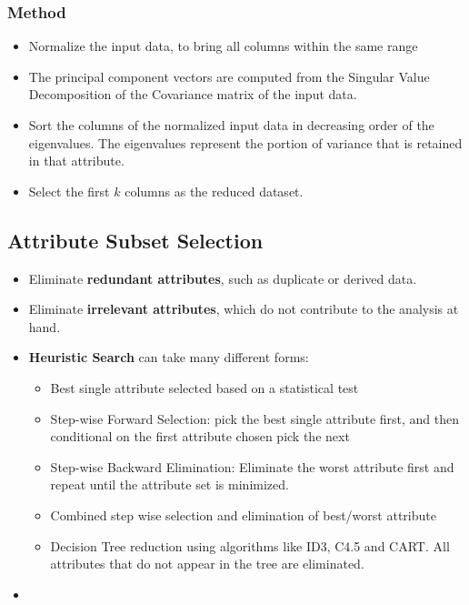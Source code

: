 \documentclass{article}
\theoremstyle{plain}
\theoremstyle{definition}
\begin{document}
\subsubsection{Method}
\begin{itemize}
    \item Normalize the input data, to bring all columns within the same range
    
    \item The principal component vectors are computed from the Singular Value Decomposition of the Covariance matrix of the input data. 
    
    \item Sort the columns of the normalized input data in decreasing order of the eigenvalues. The eigenvalues represent the portion of variance that is retained in that attribute. 
    
    \item Select the first $k$ columns as the reduced dataset. 
\end{itemize}

\subsection{Attribute Subset Selection}
\begin{itemize}
    \item Eliminate \textbf{redundant attributes}, such as duplicate or derived data.
    
    \item Eliminate \textbf{irrelevant attributes}, which do not contribute to the analysis at hand.
    
    \item \textbf{Heuristic Search} can take many different forms:
    \begin{itemize}
        \item Best single attribute selected based on a statistical test
        
        \item Step-wise Forward Selection: pick the best single attribute first, and then conditional on the first attribute chosen pick the next
        
        \item Step-wise Backward Elimination: Eliminate the worst attribute first and repeat until the attribute set is minimized.
        
        \item Combined step wise selection and elimination of best/worst attribute
        
        \item Decision Tree reduction using algorithms like ID3, C4.5 and CART. All attributes that do not appear in the tree are eliminated. 
    \end{itemize}
    
    \item 
\end{itemize}
\end{document}
